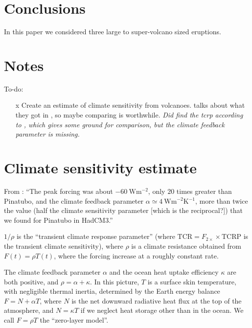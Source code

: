 \documentclass{ametsocV5}
\begin{document}
\section{Conclusions}


In this paper we considered three large to super-volcano sized eruptions.

\clearpage

\section*{Notes}

To-do:

\begin{itemize}
  \item[\lbrack{}x\rbrack{}] Create an estimate of climate sensitivity from volcanoes.
    \citet{gregory2016} talks about what they got in \citet{jones2005}, so maybe comparing
    is worthwhile. \emph{Did find the \ac{tcrp} according to \citet{merlis2014}, which gives
      some ground for comparison, but the climate feedback parameter is missing.}
\end{itemize}

\section*{Climate sensitivity estimate}

From \citet{gregory2016}: ``The peak forcing was about \(\SI{-60}{\watt\metre^{-2}}\),
only \(20\) times greater than Pinatubo, and the climate feedback parameter \(\alpha
\simeq \SI{4}{\watt\metre^{-2}\kelvin^{-1}}\), more than twice the value (half the
climate sensitivity parameter [which is the reciprocal?]) that we found for Pinatubo in
HadCM3.''

\(1/\rho \) is the ``transient climate response parameter'' (where
\(\mathrm{TCR}=F_{2\times}\times \mathrm{TCRP}\) is the transient climate sensitivity),
where \(\rho \) is a climate resistance obtained from \(F(t)=\rho T(t)\), where the
forcing increase at a roughly constant rate.

The climate feedback parameter \(\alpha\) and the ocean heat uptake efficiency
\(\kappa\) are both positive, and \(\rho =\alpha +\kappa \). In this picture, \(T\) is a
surface skin temperature, with negligible thermal inertia, determined by the Earth
energy balance \(F=N+\alpha T\), where \(N\) is the net downward radiative heat flux at
the top of the atmosphere, and \(N=\kappa T\) if we neglect heat storage other than in
the ocean. We call \(F=\rho T\) the ``zero-layer model''.
\end{document}
